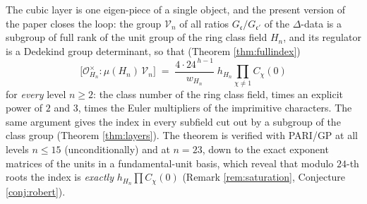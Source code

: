 \documentclass[11pt]{amsart}
\numberwithin{equation}{section}
\theoremstyle{plain}
\theoremstyle{definition}
\theoremstyle{remark}
\newcommand{\idealc}{\mathfrak{c}}
\newcommand{\Oc}{\mathcal{O}}
\begin{document}
The cubic layer is one eigen-piece of a single object, and the present
version of the paper closes the loop: the group $\mathcal{V}_n$ of all ratios
$G_\idealc/G_{\idealc'}$ of the $\Delta$-data is a subgroup of full rank of the
unit group of the ring class field $H_n$, and its regulator is a Dedekind
group determinant, so that (Theorem \ref{thm:fullindex})
\[
  \bigl[\Oc_{H_n}^\times : \mu(H_n)\,\mathcal{V}_n\bigr]
  \;=\; \frac{4\cdot24^{\,h-1}}{w_{H_n}}\;h_{H_n}\prod_{\chi\ne1}C_\chi(0)
\]
for \emph{every} level $n \ge 2$: the class number of the ring class field,
times an explicit power of $2$ and $3$, times the Euler multipliers of the
imprimitive characters.  The same argument gives the index in every
subfield cut out by a subgroup of the class group (Theorem \ref{thm:layers}).
The theorem is verified with PARI/GP at all levels $n \le 15$
(unconditionally) and at $n = 23$, down to the exact exponent matrices of the
units in a fundamental-unit basis, which reveal that modulo $24$-th roots
the index is \emph{exactly} $h_{H_n}\prod C_\chi(0)$ (Remark
\ref{rem:saturation}, Conjecture \ref{conj:robert}).
\end{document}
